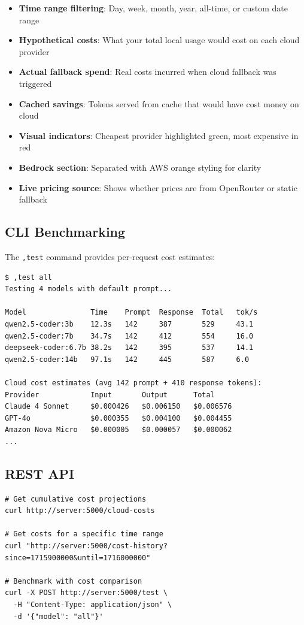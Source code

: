 \documentclass[11pt,a4paper]{article}
\begin{document}
\begin{itemize}
  \item \textbf{Time range filtering}: Day, week, month, year, all-time, or custom date range
  \item \textbf{Hypothetical costs}: What your total local usage would cost on each cloud provider
  \item \textbf{Actual fallback spend}: Real costs incurred when cloud fallback was triggered
  \item \textbf{Cached savings}: Tokens served from cache that would have cost money on cloud
  \item \textbf{Visual indicators}: Cheapest provider highlighted green, most expensive in red
  \item \textbf{Bedrock section}: Separated with AWS orange styling for clarity
  \item \textbf{Live pricing source}: Shows whether prices are from OpenRouter or static fallback
\end{itemize}

\subsection{CLI Benchmarking}

The \texttt{,test} command provides per-request cost estimates:

\begin{lstlisting}[caption={CLI benchmark with cost estimates}]
$ ,test all
Testing 4 models with default prompt...

Model               Time    Prompt  Response  Total   tok/s
qwen2.5-coder:3b    12.3s   142     387       529     43.1
qwen2.5-coder:7b    34.7s   142     412       554     16.0
deepseek-coder:6.7b 38.2s   142     395       537     14.1
qwen2.5-coder:14b   97.1s   142     445       587     6.0

Cloud cost estimates (avg 142 prompt + 410 response tokens):
Provider            Input       Output      Total
Claude 4 Sonnet     $0.000426   $0.006150   $0.006576
GPT-4o              $0.000355   $0.004100   $0.004455
Amazon Nova Micro   $0.000005   $0.000057   $0.000062
...
\end{lstlisting}

\subsection{REST API}

\begin{lstlisting}[caption={Cost estimation via API}]
# Get cumulative cost projections
curl http://server:5000/cloud-costs

# Get costs for a specific time range
curl "http://server:5000/cost-history?since=1715900000&until=1716000000"

# Benchmark with cost comparison
curl -X POST http://server:5000/test \
  -H "Content-Type: application/json" \
  -d '{"model": "all"}'
\end{lstlisting}
\end{document}
